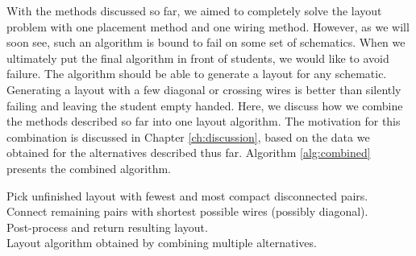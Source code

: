 With the methods discussed so far, we aimed to completely solve the layout problem
with one placement method and one wiring method. However, as we will soon see,
such an algorithm is bound to fail on some set of schematics. When we ultimately
put the final algorithm in front of students, we would like to avoid failure.
The algorithm should be able to generate a layout for any schematic.
Generating a layout
with a few diagonal or crossing wires is better than silently failing and leaving
the student empty handed. Here, we discuss how we combine the methods
described so far into one layout algorithm. The motivation for this combination
is discussed in Chapter \ref{ch:discussion}, based on the data we obtained
for the alternatives described thus far.
Algorithm \ref{alg:combined} presents the
combined algorithm.

\begin{algorithm}
\BlankLine
{}
Pick unfinished layout with fewest and most compact disconnected pairs.\\
Connect remaining pairs with shortest possible wires (possibly diagonal).\\
Post-process and return resulting layout.\\
\caption{Layout algorithm obtained by combining multiple alternatives.}
\label{alg:combined}
\end{algorithm}

